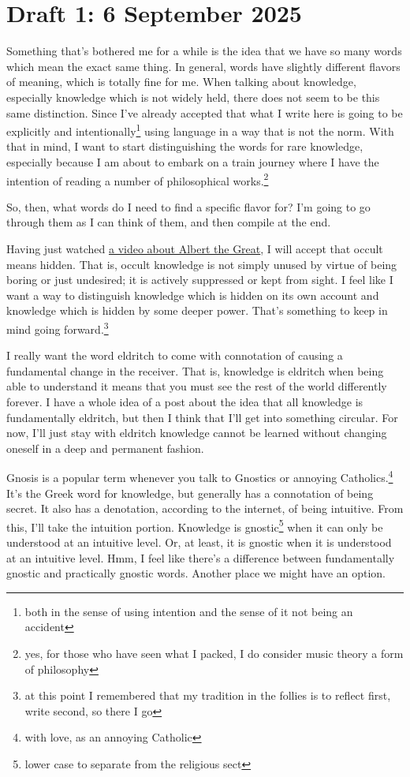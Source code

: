 \documentclass[12pt]{article}
\renewcommand{\,}{\textsuperscript{,}}
\begin{document}
\section{Draft 1: 6 September 2025}

Something that's bothered me for a while is the idea that we have so many words which mean the exact same thing.  
In general, words have slightly different flavors of meaning, which is totally fine for me.  
When talking about knowledge, especially knowledge which is not widely held, there does not seem to be this same distinction.  
Since I've already accepted that what I write here is going to be explicitly and intentionally\footnote{both in the sense of using intention and the sense of it not being an accident} using language in a way that is not the norm.  
With that in mind, I want to start distinguishing the words for rare knowledge, especially because I am about to embark on a train journey where I have the intention of reading a number of philosophical works.\footnote{yes, for those who have seen what I packed, I do consider music theory a form of philosophy}

So, then, what words do I need to find a specific flavor for?  
I'm going to go through them as I can think of them, and then compile at the end.

Having just watched \href{https://www.youtube.com/watch?v=JW7obfLcW9U}{a video about Albert the Great}, I will accept that occult means hidden.  
That is, occult knowledge is not simply unused by virtue of being boring or just undesired; it is actively suppressed or kept from sight.  
I feel like I want a way to distinguish knowledge which is hidden on its own account and knowledge which is hidden by some deeper power.  
That's something to keep in mind going forward.\footnote{at this point I remembered that my tradition in the follies is to reflect first, write second, so there I go}

I really want the word eldritch to come with connotation of causing a fundamental change in the receiver.  
That is, knowledge is eldritch when being able to understand it means that you must see the rest of the world differently forever.  
I have a whole idea of a post about the idea that all knowledge is fundamentally eldritch, but then I think that I'll get into something circular.  
For now, I'll just stay with eldritch knowledge cannot be learned without changing oneself in a deep and permanent fashion.

Gnosis is a popular term whenever you talk to Gnostics or annoying Catholics.\footnote{with love, as an annoying Catholic}  
It's the Greek word for knowledge, but generally has a connotation of being secret.  
It also has a denotation, according to the internet, of being intuitive.  
From this, I'll take the intuition portion.  
Knowledge is gnostic\footnote{lower case to separate from the religious sect} when it can only be understood at an intuitive level.  
Or, at least, it is gnostic when it is understood at an intuitive level.  
Hmm, I feel like there's a difference between fundamentally gnostic and practically gnostic words.  
Another place we might have an option.
\end{document}
